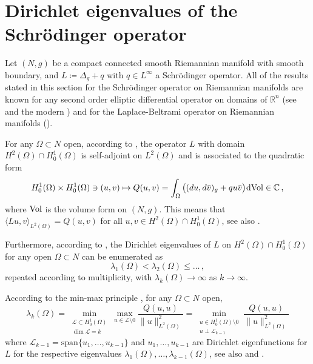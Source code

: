 \documentclass[11pt]{amsart}
\theoremstyle{definition}
\numberwithin{equation}{section}
\newcommand{\mR}{\mathbb{R}}                    %
\newcommand{\norm}[1]{\lVert #1 \rVert}         %
\newcommand{\dd}{\mathrm{d}}
\newcommand{\s}{\hspace{0.5pt}}
\begin{document}
\section{Dirichlet eigenvalues of the Schr\"odinger operator}\label{sec:ev}

    Let $(N,g)$ be a compact connected smooth Riemannian manifold with smooth boundary, and $L \coloneqq \Delta_{g}+q$ with $q\in L^\infty$ a Schr\"odinger operator. %
    All of the results stated in this section for the Schr\"odinger operator on Riemannian manifolds are known for any second order elliptic differential operator on domains of $\mR^n$ (see \cite{zbMATH03230686,zbMATH00048198} and the modern \cite{zbMATH07819857}) and for the Laplace-Beltrami operator on Riemannian manifolds (\cite{zbMATH03877889}).

For any $\Omega\subset N$ open, according to \cite[\S~2.2.4]{MR1889089}, the operator $L$ with domain $H^2(\Omega)\cap H^1_0(\Omega)$ is self-adjoint on $L^2(\Omega)$ and is associated to the quadratic form
\[
    H^1_0(\Omega)\times H^1_0(\Omega) \ni (u,v) \mapsto Q(u,v) = \int_\Omega \big((du,d\bar v)_{g}+qu\bar v\big)\s\dd {\rm Vol} \in \mathbb{C}\,,
\]
where ${\rm Vol}$ is the volume form on $(N,g)$. This means that $\langle Lu, v\rangle_{L^2(\Omega)} = Q(u,v)$ for all $u,v\in H^2(\Omega)\cap H^1_0(\Omega)$, see also \cite[Lem.~2.20]{MR1889089}. 

Furthermore, according to \cite[Thm.~2.21]{MR1889089}, the Dirichlet eigenvalues of $L$ on $H^2(\Omega)\cap H_0^1(\Omega)$ for any open $\Omega\subset N$ can be enumerated as 
\[
    \lambda_1(\Omega) < \lambda_2(\Omega)\leq \dots\,,
\]
repeated according to multiplicity, with $\lambda_k(\Omega) \to \infty$ as $k\to\infty$. 

According to the min-max principle \cite{zbMATH03315567}, for any $\Omega\subset N$ open, 
\begin{equation}\label{eq:minmax}
    \lambda_k(\Omega) = \min_{\substack{\mathcal{L}\subset H^1_0(\Omega)\\\dim \mathcal{L}=k}} \max_{u\in \mathcal{L}\setminus 0} \frac{Q(u,u)}{\norm{u}_{L^2(\Omega)}^2} = \min_{\substack{u\in H^1_0(\Omega)\setminus 0\\ u\perp \mathcal{L}_{k-1}}}\frac{Q(u,u)}{\norm{u}_{L^2(\Omega)}^2}
\end{equation}
where $\mathcal{L}_{k-1} = \mathrm{span}\{u_1,\dots,u_{k-1}\}$ and $u_1,\dots,u_{k-1}$ are Dirichlet eigenfunctions for $L$ for the respective eigenvalues $\lambda_1(\Omega),\dots,\lambda_{k-1}(\Omega)$, see also \cite[Prop.~3.1.3,~Rem.~3.1.4]{zbMATH07759244} and \cite[Eq.~(3)]{zbMATH01346906}.
\end{document}

